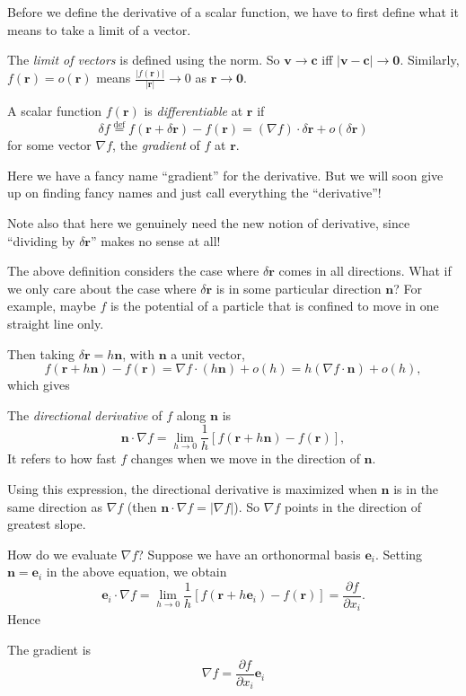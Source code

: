 \documentclass[a4paper]{article}
\begin{document}
Before we define the derivative of a scalar function, we have to first define what it means to take a limit of a vector.
\begin{defi}
  The \emph{limit of vectors} is defined using the norm. So $\mathbf{v}\to \mathbf{c}$ iff $|\mathbf{v} - \mathbf{c}| \to \mathbf{0}$. Similarly, $f(\mathbf{r}) = o(\mathbf{r})$ means $\frac{|f(\mathbf{r})|}{|\mathbf{r}|} \to 0$ as $\mathbf{r}\to \mathbf{0}$.
\end{defi}

\begin{defi}
  A scalar function $f(\mathbf{r})$ is \emph{differentiable} at $\mathbf{r}$ if
  \[
    \delta f \stackrel{\text{def}}{=} f(\mathbf{r} + \delta \mathbf{r}) - f(\mathbf{r}) = (\nabla f)\cdot \delta \mathbf{r} + o(\delta \mathbf{r})
  \]
  for some vector $\nabla f$, the \emph{gradient} of $f$ at $\mathbf{r}$.
\end{defi}
Here we have a fancy name ``gradient'' for the derivative. But we will soon give up on finding fancy names and just call everything the ``derivative''!

Note also that here we genuinely need the new notion of derivative, since ``dividing by $\delta \mathbf{r}$'' makes no sense at all!

The above definition considers the case where $\delta \mathbf{r}$ comes in all directions. What if we only care about the case where $\delta \mathbf{r}$ is in some particular direction $\mathbf{n}$? For example, maybe $f$ is the potential of a particle that is confined to move in one straight line only.

Then taking $\delta \mathbf{r} = h\mathbf{n}$, with $\mathbf{n}$ a unit vector,
\[
  f(\mathbf{r} + h\mathbf{n}) - f(\mathbf{r}) = \nabla f \cdot (h\mathbf{n}) + o(h) = h(\nabla f\cdot \mathbf{n}) + o(h),
\]
which gives
\begin{defi}
  The \emph{directional derivative} of $f$ along $\mathbf{n}$ is
  \[
    \mathbf{n}\cdot \nabla f = \lim_{h \to 0} \frac{1}{h}[f(\mathbf{r} + h\mathbf{n}) - f(\mathbf{r})],
  \]
  It refers to how fast $f$ changes when we move in the direction of $\mathbf{n}$.
\end{defi}
Using this expression, the directional derivative is maximized when $\mathbf{n}$ is in the same direction as $\nabla f$ (then $\mathbf{n}\cdot \nabla f = |\nabla f|$). So $\nabla f$ points in the direction of greatest slope.

How do we evaluate $\nabla f$? Suppose we have an orthonormal basis $\mathbf{e}_i$. Setting $\mathbf{n} = \mathbf{e}_i$ in the above equation, we obtain
\[
  \mathbf{e}_i \cdot \nabla f = \lim_{h\to 0} \frac{1}{h}[f(\mathbf{r} + h\mathbf{e}_i) - f(\mathbf{r})] = \frac{\partial f}{\partial x_i}.
\]
Hence
\begin{thm}
  The gradient is
  \[
    \nabla f = \frac{\partial f}{\partial x_i}\mathbf{e}_i
  \]
\end{thm}
\end{document}
